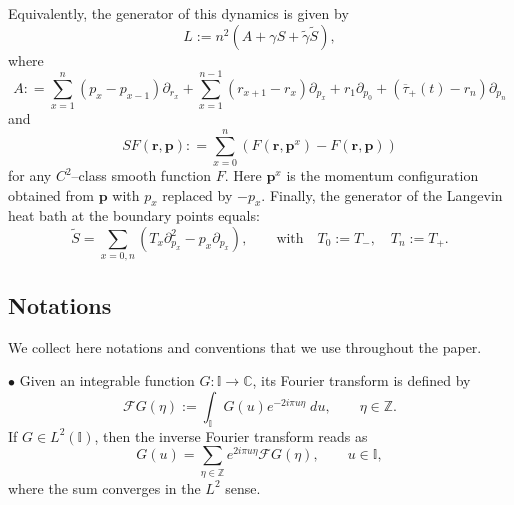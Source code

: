 \documentclass[EJP]{ejpecp} %
\newcommand\T{{\mathbb I}}
\newcommand\Z{{\mathbb Z}}
\renewcommand{\tilde}{\widetilde}
\renewcommand{\bar}{\overline}
\numberwithin{equation}{section}
\begin{document}
\bigskip


Equivalently, the generator of this dynamics is given by 
\begin{equation}
  \label{eq:generator}
  L := n^2 \left(A + \gamma S + \tilde\gamma \tilde S \right),
\end{equation}
where
\begin{equation}
  \label{eq:A}
  A: = \sum_{x=1}^n (p_x - p_{x-1}) \partial_{r_x} + \sum_{x=1}^{n-1} (r_{x+1} - r_x) \partial_{p_x}
  + r_1 \partial_{p_0} + \left(\bar\tau_+(t) - r_n\right) \partial_{p_n}
\end{equation}
and
\begin{equation}
  \label{eq:S}
  S F (\mathbf{r},\mathbf{p}): = \sum_{x=0}^n
  \left(F(\mathbf{r},\mathbf{p}^x) -
    F(\mathbf{r},\mathbf{p})\right)
\end{equation}
for any $C^2$--class smooth function $F$.
Here $\mathbf{p}^x$ is
the momentum configuration obtained from $\mathbf{p}$ with $p_x$
replaced by $-p_x$.
Finally, the generator of the Langevin heat bath at the boundary points equals:
\begin{equation}
  \label{eq:tS}
  \tilde S = 
  \sum_{x=0,n} \left( T_x \partial_{p_x}^2 - p_x \partial_{p_x} \right) , \qquad \text{with} \quad T_0:=T_-,
  \quad T_n := T_+. 
\end{equation}





\subsection{Notations}
\label{sec:some-notat-elem}

We collect here notations and conventions that we use throughout the paper.


$\bullet$ Given an integrable function $G:\T \to \mathbb C$, its Fourier transform is defined by
\begin{equation}
  \label{eq:F1}
  \mathcal F G (\eta) := \int_{\T} G(u) e^{-2i\pi u \eta} \; du, \qquad \eta\in \Z.
\end{equation}
If $G\in L^2(\T)$, then the inverse Fourier transform reads as
\begin{equation}
  \label{eq:F2}
  G(u) = \sum_{\eta\in \Z} e^{2i\pi u \eta} \mathcal F G (\eta) ,\qquad u\in\T,
\end{equation}
where the sum converges in the $L^2$ sense. 
\end{document}

